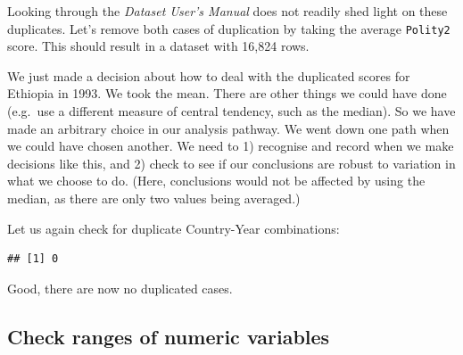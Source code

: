 \documentclass[]{book}
\newenvironment{Shaded}{\begin{snugshade}}{\end{snugshade}}
\newcommand{\DataTypeTok}[1]{\textcolor[rgb]{0.13,0.29,0.53}{#1}}
\newcommand{\KeywordTok}[1]{\textcolor[rgb]{0.13,0.29,0.53}{\textbf{#1}}}
\newcommand{\NormalTok}[1]{#1}
\newcommand{\OperatorTok}[1]{\textcolor[rgb]{0.81,0.36,0.00}{\textbf{#1}}}
\newcommand{\StringTok}[1]{\textcolor[rgb]{0.31,0.60,0.02}{#1}}
\begin{document}
Looking through the \emph{Dataset User's Manual} does not readily shed light on these duplicates. Let's remove both cases of duplication by taking the average \texttt{Polity2} score. This should result in a dataset with 16,824 rows.

\begin{Shaded}
\end{Shaded}

\begin{warning}
We just made a decision about how to deal with the duplicated scores for
Ethiopia in 1993. We took the mean. There are other things we could have
done (e.g.~use a different measure of central tendency, such as the
median). So we have made an arbitrary choice in our analysis pathway. We
went down one path when we could have chosen another. We need to 1)
recognise and record when we make decisions like this, and 2) check to
see if our conclusions are robust to variation in what we choose to do.
(Here, conclusions would not be affected by using the median, as there
are only two values being averaged.)
\end{warning}

Let us again check for duplicate Country-Year combinations:

\begin{Shaded}
\end{Shaded}

\begin{verbatim}
## [1] 0
\end{verbatim}

Good, there are now no duplicated cases.

\hypertarget{check-ranges-of-numeric-variables}{%
\subsection{Check ranges of numeric variables}\label{check-ranges-of-numeric-variables}}
\end{document}
